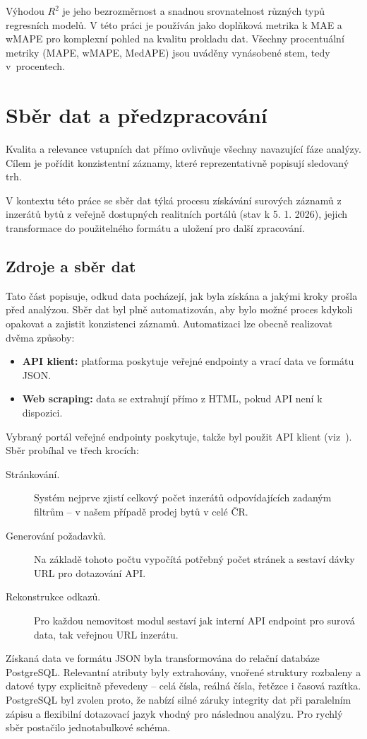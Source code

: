 Výhodou $R^2$ je jeho bezrozměrnost a snadnou srovnatelnost různých typů regresních modelů. V této práci je používán jako doplňková metrika k MAE a wMAPE pro komplexní pohled na kvalitu prokladu dat. Všechny procentuální metriky (MAPE, wMAPE, MedAPE) jsou uváděny vynásobené stem, tedy v~procentech.

\chapter{Sběr dat a předzpracování}
\label{sec:data}
Kvalita a relevance vstupních dat přímo ovlivňuje všechny navazující fáze analýzy. Cílem je pořídit konzistentní záznamy, které reprezentativně popisují sledovaný trh.

V kontextu této práce se sběr dat týká procesu získávání surových záznamů z inzerátů bytů z veřejně dostupných realitních portálů (stav k 5. 1. 2026), jejich transformace do použitelného formátu a uložení pro další zpracování.
\section{Zdroje a sběr dat}
\label{sec:data_sources}
Tato část popisuje, odkud data pocházejí, jak byla získána a jakými kroky prošla před analýzou.
Sběr dat byl plně automatizován, aby bylo možné proces kdykoli opakovat a zajistit konzistenci záznamů. Automatizaci lze obecně realizovat dvěma způsoby:
\begin{itemize}
\item \textbf{API klient:} platforma poskytuje veřejné endpointy a vrací data ve formátu JSON.
\item \textbf{Web scraping:} data se extrahují přímo z HTML, pokud API není k dispozici.
\end{itemize}
Vybraný portál veřejné endpointy poskytuje, takže byl použit API klient (viz~\cite{Sreality}). Sběr probíhal ve třech krocích:
\begin{description}
\item[Stránkování.] Systém nejprve zjistí celkový počet inzerátů odpovídajících zadaným filtrům -- v našem případě prodej bytů v celé ČR.
\item[Generování požadavků.] Na základě tohoto počtu vypočítá potřebný počet stránek a sestaví dávky URL pro dotazování API.
\item[Rekonstrukce odkazů.] Pro každou nemovitost modul sestaví jak interní API endpoint pro surová data, tak veřejnou URL inzerátu.
\end{description}
Získaná data ve formátu JSON byla transformována do relační databáze PostgreSQL. Relevantní atributy byly extrahovány, vnořené struktury rozbaleny a datové typy explicitně převedeny -- celá čísla, reálná čísla, řetězce i časová razítka. PostgreSQL byl zvolen proto, že nabízí silné záruky integrity dat při paralelním zápisu a flexibilní dotazovací jazyk vhodný pro následnou analýzu. Pro rychlý sběr postačilo jednotabulkové schéma.


